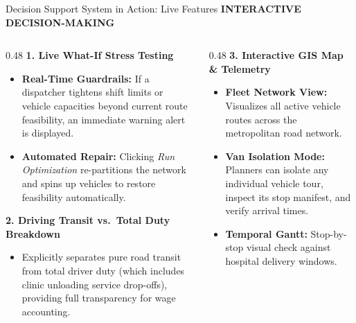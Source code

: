 \documentclass[aspectratio=169,10pt]{beamer}
\newcommand{\sectiontag}[1]{%
    {\scriptsize\bfseries\color{Accent}\MakeUppercase{#1}}\par\vspace{0.08cm}
}
\begin{document}
\begin{frame}{Decision Support System in Action: Live Features}
\sectiontag{Interactive Decision-Making}

\vspace{-0.15cm}

\begin{columns}[T,totalwidth=\textwidth]
    \begin{column}{0.48\textwidth}
        \textbf{\color{Primary}\small 1. Live What-If Stress Testing}
        \vspace{0.04cm}
        \begin{itemize}
            \setlength{\itemsep}{2pt}
            \scriptsize
            \item \textbf{Real-Time Guardrails:} If a dispatcher tightens shift limits or vehicle capacities beyond current route feasibility, an immediate warning alert is displayed.
            \item \textbf{Automated Repair:} Clicking \textit{Run Optimization} re-partitions the network and spins up vehicles to restore feasibility automatically.
        \end{itemize}

        \vspace{0.15cm}
        \textbf{\color{Primary}\small 2. Driving Transit vs.\ Total Duty Breakdown}
        \vspace{0.04cm}
        \begin{itemize}
            \setlength{\itemsep}{2pt}
            \scriptsize
            \item Explicitly separates pure road transit from total driver duty (which includes clinic unloading service drop-offs), providing full transparency for wage accounting.
        \end{itemize}
    \end{column}

    \begin{column}{0.48\textwidth}
        \textbf{\color{Primary}\small 3. Interactive GIS Map \& Telemetry}
        \vspace{0.04cm}
        \begin{itemize}
            \setlength{\itemsep}{2pt}
            \scriptsize
            \item \textbf{Fleet Network View:} Visualizes all active vehicle routes across the metropolitan road network.
            \item \textbf{Van Isolation Mode:} Planners can isolate any individual vehicle tour, inspect its stop manifest, and verify arrival times.
            \item \textbf{Temporal Gantt:} Stop-by-stop visual check against hospital delivery windows.
        \end{itemize}


\end{column}
\end{columns}
\end{frame}
\end{document}
